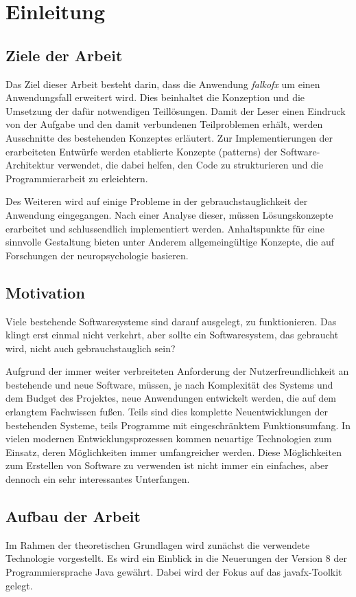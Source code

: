 \chapter{Einleitung}
\section{Ziele der Arbeit} \label{sec:einlZiel}
Das Ziel dieser Arbeit besteht darin, dass die Anwendung \textit{\gls{falkofx}} um einen Anwendungsfall erweitert wird. Dies beinhaltet die Konzeption und die Umsetzung der dafür notwendigen Teillösungen. Damit der Leser einen Eindruck von der Aufgabe und den damit verbundenen Teilproblemen erhält, werden Ausschnitte des bestehenden Konzeptes erläutert. Zur Implementierungen der erarbeiteten Entwürfe werden etablierte Konzepte (\gls{pattern}s) der Software-Architektur verwendet, die dabei helfen, den Code zu strukturieren und die Programmierarbeit zu erleichtern.

Des Weiteren wird auf einige Probleme in der \gls{gebrauchstauglichkeit} der Anwendung eingegangen. Nach einer Analyse dieser, müssen Lösungskonzepte erarbeitet und schlussendlich implementiert werden. Anhaltspunkte für eine sinnvolle Gestaltung bieten unter Anderem allgemeingültige Konzepte, die auf Forschungen der \gls{neuropsychologie} basieren.
\section{Motivation} \label{sec:einlMotivation}
Viele bestehende Softwaresysteme sind darauf ausgelegt, zu funktionieren. Das klingt erst einmal nicht verkehrt, aber sollte ein Softwaresystem, das gebraucht wird, nicht auch gebrauchstauglich sein?

Aufgrund der immer weiter verbreiteten Anforderung der Nutzerfreundlichkeit an bestehende und neue Software, müssen, je nach Komplexität des Systems und dem Budget des Projektes, neue Anwendungen entwickelt werden, die auf dem erlangtem Fachwissen fußen. Teils sind dies komplette Neuentwicklungen der bestehenden Systeme, teils Programme mit eingeschränktem Funktionsumfang. In vielen modernen Entwicklungsprozessen kommen neuartige Technologien zum Einsatz, deren Möglichkeiten immer umfangreicher werden. Diese Möglichkeiten zum Erstellen von Software zu verwenden ist nicht immer ein einfaches, aber dennoch ein sehr interessantes Unterfangen.
\section{Aufbau der Arbeit} \label{sec:einlAufbau}
Im Rahmen der theoretischen Grundlagen wird zunächst die verwendete Technologie vorgestellt. Es wird ein Einblick in die Neuerungen der Version 8 der Programmiersprache Java gewährt. Dabei wird der Fokus auf das \gls{javafx}-Toolkit gelegt.

